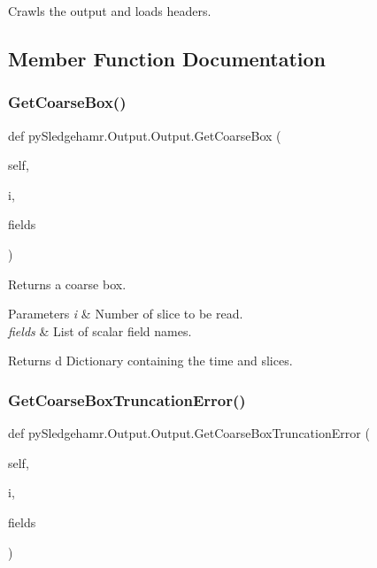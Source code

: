 Crawls the output and loads headers. 



\subsection{Member Function Documentation}
\mbox{\label{classpySledgehamr_1_1Output_1_1Output_adb45cd0e082a0428b86c1d77faae8cc8}} 
\subsubsection{\texorpdfstring{Get\+Coarse\+Box()}{GetCoarseBox()}}
{\footnotesize\ttfamily def py\+Sledgehamr.\+Output.\+Output.\+Get\+Coarse\+Box (\begin{DoxyParamCaption}\item[{}]{self,  }\item[{}]{i,  }\item[{}]{fields }\end{DoxyParamCaption})}



Returns a coarse box. 


\begin{DoxyParams}{Parameters}
{\em i} & Number of slice to be read. \\
\hline
{\em fields} & List of scalar field names. \\
\hline
\end{DoxyParams}
\begin{DoxyReturn}{Returns}
d Dictionary containing the time and slices. 
\end{DoxyReturn}
\mbox{\label{classpySledgehamr_1_1Output_1_1Output_a3cb3dfd7b75646e722b7f527ec610485}} 
\subsubsection{\texorpdfstring{Get\+Coarse\+Box\+Truncation\+Error()}{GetCoarseBoxTruncationError()}}
{\footnotesize\ttfamily def py\+Sledgehamr.\+Output.\+Output.\+Get\+Coarse\+Box\+Truncation\+Error (\begin{DoxyParamCaption}\item[{}]{self,  }\item[{}]{i,  }\item[{}]{fields }\end{DoxyParamCaption})}



